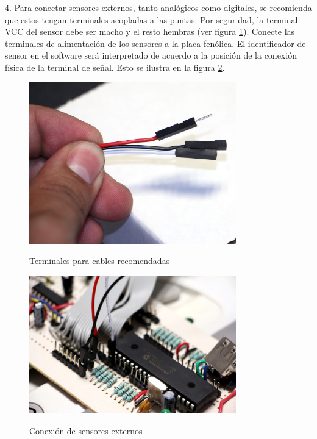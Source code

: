 \documentclass[letterpaper,openright,12pt]{book}
\begin{document}
4. Para conectar sensores externos, tanto analógicos como digitales, se recomienda que estos tengan terminales acopladas a las puntas. Por seguridad, la terminal VCC del sensor debe ser macho y el resto hembras (ver figura \ref{fig:cables}). Conecte las terminales de alimentación de los sensores a la placa fenólica. El identificador de sensor en el software será  interpretado de acuerdo a la posición de la conexión física de la terminal de señal. Esto se ilustra en la figura \ref{fig:sensors}.\\
\begin{figure}
\begin{center}
\includegraphics[width=0.8\textwidth]{figures/cables.jpg}
\caption{Terminales para cables recomendadas}
\centering
\label{fig:cables}
\end{center}
\end{figure} 
\begin{figure}
\begin{center}
\includegraphics[width=0.8\textwidth]{figures/sensors.jpg}
\caption{Conexión de sensores externos}
\centering
\label{fig:sensors}
\end{center}
\end{figure} 
\end{document}

